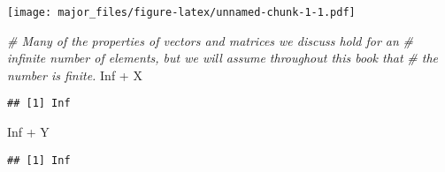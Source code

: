 \documentclass[
]{article}
\newenvironment{Shaded}{\begin{snugshade}}{\end{snugshade}}
\newcommand{\CommentTok}[1]{\textcolor[rgb]{0.56,0.35,0.01}{\textit{#1}}}
\newcommand{\ConstantTok}[1]{\textcolor[rgb]{0.00,0.00,0.00}{#1}}
\newcommand{\NormalTok}[1]{#1}
\newcommand{\SpecialCharTok}[1]{\textcolor[rgb]{0.00,0.00,0.00}{#1}}
\begin{document}
\texttt{[image: major\_files/figure-latex/unnamed-chunk-1-1.pdf]}

\begin{Shaded}
\begin{Highlighting}[]
\CommentTok{\# Many of the properties of vectors and matrices we discuss hold for an}
\CommentTok{\# inﬁnite number of elements, but we will assume throughout this book that}
\CommentTok{\# the number is ﬁnite.}
\ConstantTok{Inf} \SpecialCharTok{+}\NormalTok{ X}
\end{Highlighting}
\end{Shaded}

\begin{verbatim}
## [1] Inf
\end{verbatim}

\begin{Shaded}
\begin{Highlighting}[]
\ConstantTok{Inf} \SpecialCharTok{+}\NormalTok{ Y}
\end{Highlighting}
\end{Shaded}

\begin{verbatim}
## [1] Inf
\end{verbatim}
\end{document}
